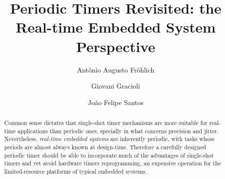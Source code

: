 \documentclass[final,3pd,times]{elsarticle}
\begin{document}
\begin{frontmatter}



\title{Periodic Timers Revisited: the Real-time Embedded System Perspective}


\author{Ant\^{o}nio Augusto Fr\"{o}hlich}
\author{Giovani Gracioli}
\author{Jo\~{a}o Felipe Santos}

\address{Software/Hardware Integration Lab, Federal University of Santa
  Catarina, 88040-900 Florian\'{o}polis - SC, Brazil }


\begin{abstract}
  Common sense dictates that single-shot timer mechanisms are more
  suitable for real-time applications than periodic ones, specially in
  what concerns precision and jitter. Nevertheless, \emph{real-time
    embedded systems} are inherently periodic, with tasks whose periods
  are almost always known at design-time. Therefore a carefully designed
  periodic timer should be able to incorporate much of the advantages of
  single-shot timers and yet avoid hardware timers reprogramming, an
  expensive operation for the limited-resource platforms of typical
  embedded systems.


\end{abstract}
\end{frontmatter}
\end{document}
